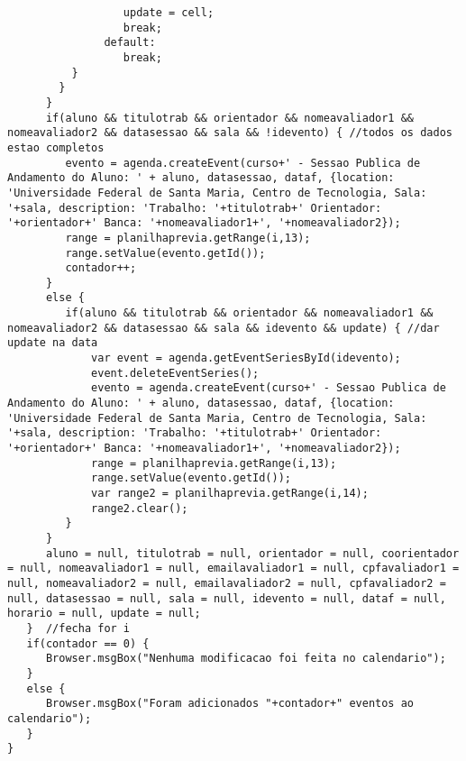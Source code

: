 \begin{lstlisting}
                  update = cell;
                  break;
               default:
                  break;
          } 
        } 
      }
      if(aluno && titulotrab && orientador && nomeavaliador1 && nomeavaliador2 && datasessao && sala && !idevento) { //todos os dados estao completos
         evento = agenda.createEvent(curso+' - Sessao Publica de Andamento do Aluno: ' + aluno, datasessao, dataf, {location: 'Universidade Federal de Santa Maria, Centro de Tecnologia, Sala: '+sala, description: 'Trabalho: '+titulotrab+' Orientador: '+orientador+' Banca: '+nomeavaliador1+', '+nomeavaliador2});
         range = planilhaprevia.getRange(i,13);
         range.setValue(evento.getId());   
         contador++;
      }
      else { 
         if(aluno && titulotrab && orientador && nomeavaliador1 && nomeavaliador2 && datasessao && sala && idevento && update) { //dar update na data
             var event = agenda.getEventSeriesById(idevento); 
             event.deleteEventSeries();
             evento = agenda.createEvent(curso+' - Sessao Publica de Andamento do Aluno: ' + aluno, datasessao, dataf, {location: 'Universidade Federal de Santa Maria, Centro de Tecnologia, Sala: '+sala, description: 'Trabalho: '+titulotrab+' Orientador: '+orientador+' Banca: '+nomeavaliador1+', '+nomeavaliador2});
             range = planilhaprevia.getRange(i,13);
             range.setValue(evento.getId());  
             var range2 = planilhaprevia.getRange(i,14);
             range2.clear();
         }
      }
      aluno = null, titulotrab = null, orientador = null, coorientador = null, nomeavaliador1 = null, emailavaliador1 = null, cpfavaliador1 = null, nomeavaliador2 = null, emailavaliador2 = null, cpfavaliador2 = null, datasessao = null, sala = null, idevento = null, dataf = null, horario = null, update = null;
   }  //fecha for i
   if(contador == 0) {
      Browser.msgBox("Nenhuma modificacao foi feita no calendario");
   }
   else { 
      Browser.msgBox("Foram adicionados "+contador+" eventos ao calendario");
   }
}
  

\end{lstlisting}
